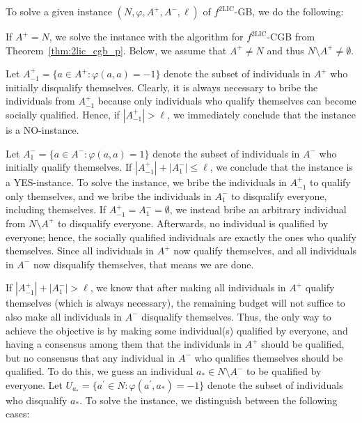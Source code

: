 \documentclass[
    12pt,               %
    a4paper,            %
    bibtotoc,           %
    pointlessnumbers,   %
    ngerman,            %
    titlepage,          %
    leqno,              %
    ]{scrarticle}       %
\newcommand\thmref{Theorem~\ref}
\begin{document}
\begin{Proof}
To solve a given instance $(N, \varphi, A^+, A^-, \ell)$ of $f^{\text{2LIC}}$-GB, we do the following:

If $A^+ = N$, we solve the instance with the algorithm for $f^{\text{2LIC}}$-CGB from \thmref{thm:2lic_cgb_p}. Below, we assume that $A^+ \neq N$ and thus $N \setminus A^+ \neq \emptyset$.

Let $A^+_{-1} = \{ a \in A^+ : \varphi(a, a) = -1 \}$ denote the subset of individuals in $A^+$ who initially disqualify themselves. Clearly, it is always necessary to bribe the individuals from $A^+_{-1}$ because only individuals who qualify themselves can become socially qualified. Hence, if $|A^+_{-1}| > \ell$, we immediately conclude that the instance is a NO-instance.

Let $A^-_{1} = \{ a \in A^- : \varphi(a, a) = 1 \}$ denote the subset of individuals in $A^-$ who initially qualify themselves. If $|A^+_{-1}| + |A^-_{1}| \leq \ell$, we conclude that the instance is a YES-instance. To solve the instance, we bribe the individuals in $A^+_{-1}$ to qualify only themselves, and we bribe the individuals in $A^-_{1}$ to disqualify everyone, including themselves. If $A^+_{-1} = A^-_{1} = \emptyset$, we instead bribe an arbitrary individual from $N \setminus A^+$ to disqualify everyone. Afterwards, no individual is qualified by everyone; hence, the socially qualified individuals are exactly the ones who qualify themselves. Since all individuals in $A^+$ now qualify themselves, and all individuals in $A^-$ now disqualify themselves, that means we are done.

If $|A^+_{-1}| + |A^-_{1}| > \ell$, we know that after making all individuals in $A^+$ qualify themselves (which is always necessary), the remaining budget will not suffice to also make all individuals in $A^-$ disqualify themselves. Thus, the only way to achieve the objective is by making some individual(s) qualified by everyone, and having a consensus among them that the individuals in $A^+$ should be qualified, but no consensus that any individual in $A^-$ who qualifies themselves should be qualified. To do this, we guess an individual $a_\ast \in N \setminus A^-$ to be qualified by everyone. Let $U_{a_\ast} = \{ a^\prime \in N : \varphi(a^\prime, a_\ast) = -1 \}$ denote the subset of individuals who disqualify $a_\ast$. To solve the instance, we distinguish between the following cases:

\begin{enumerate}[
    leftmargin=*,
    label={\textit{Case \ref*{thm:2lic_gb_p}.\arabic*}:},
    ref={\ref*{thm:2lic_gb_p}.\arabic*}
]


\end{enumerate}
\end{Proof}
\end{document}
